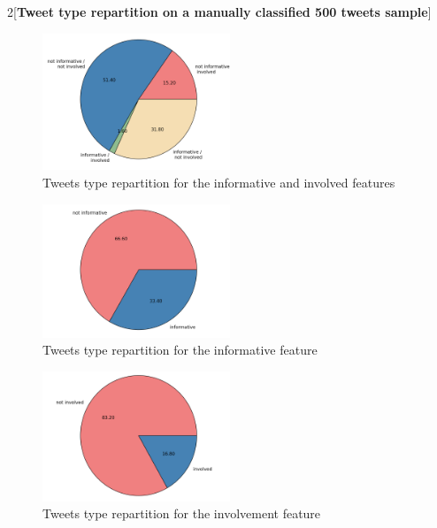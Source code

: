 \documentclass[a4paper,12pt]{report}
\begin{document}
\newpage

\begin{multicols}{2}[\textbf{Tweet type repartition on a manually classified 500 tweets sample}]

\begin{figure}[H]
\centering
\includegraphics[width=0.5\textwidth]{images/plots/pies/pie_pairs.png}
\caption{Tweets type repartition for the informative and involved features}
\label{pieTypeInfInv}
\end{figure}
\begin{figure}[H]
\centering
\includegraphics[width=0.5\textwidth]{images/plots/pies/pie_info.png}
\caption{Tweets type repartition for the informative feature}
\label{pieTypeInf}
\end{figure}
\begin{figure}[H]
\centering
\includegraphics[width=0.5\textwidth]{images/plots/pies/pie_invo.png}
\caption{Tweets type repartition for the involvement feature}
\label{pieTypeInv}
\end{figure}
\vspace*{-1cm}
\begin{figure}[H]

\end{figure}
\end{multicols}
\end{document}
